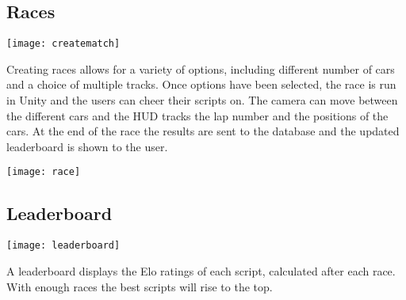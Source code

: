 \subsection{Races}
\centerline{\texttt{[image: creatematch]}}
Creating races allows for a variety of options, including different number of cars and a choice of multiple tracks. Once options have been selected, the race is run in Unity and the users can cheer their scripts on. The camera can move between the different cars and the HUD tracks the lap number and the positions of the cars. At the end of the race the results are sent to the database and the updated leaderboard is shown to the user.

\centerline{\texttt{[image: race]}}

\subsection{Leaderboard}
\centerline{\texttt{[image: leaderboard]}}
A leaderboard displays the Elo ratings of each script, calculated after each race. With enough races the best scripts will rise to the top.
